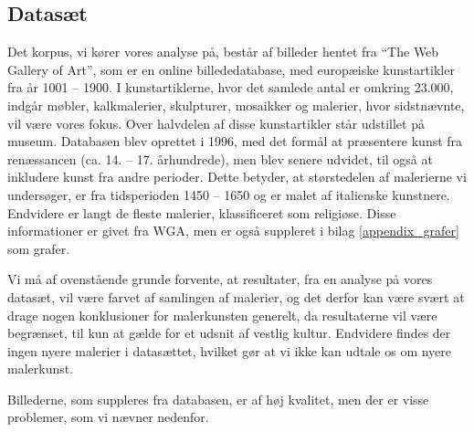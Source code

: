 {\subsection{Datasæt}
Det korpus, vi kører vores analyse på, består af billeder hentet fra
``The Web Gallery of Art''\cite{wgahu}, som er en online billededatabase, med
europæiske kunstartikler fra år 1001 -- 1900. I kunstartiklerne, hvor
det samlede antal er omkring 23.000, indgår møbler, kalkmalerier,
skulpturer, mosaikker og malerier, hvor sidstnævnte, vil være vores
fokus. Over halvdelen af disse kunstartikler står udstillet på museum.
Databasen blev oprettet i 1996, med det formål at præsentere kunst fra
renæssancen (ca.  14. -- 17.  århundrede), men blev senere udvidet, til
også at inkludere kunst fra andre perioder. Dette betyder, at
størstedelen af malerierne vi undersøger, er fra tidsperioden 1450 --
1650 og er malet af italienske kunstnere. Endvidere er langt de fleste
malerier, klassificeret som religiøse.  Disse informationer er givet fra
WGA, men er også suppleret i bilag \ref{appendix_grafer} som
grafer.

Vi må af ovenstående grunde forvente, at resultater, fra en analyse på
vores datasæt, vil være farvet af samlingen af malerier, og det derfor
kan være svært at drage nogen konklusioner for malerkunsten generelt, da
resultaterne vil være begrænset, til kun at gælde for et udsnit af
vestlig kultur. Endvidere findes der ingen nyere malerier i datasættet,
hvilket gør at vi ikke kan udtale os om nyere malerkunst.

Billederne, som suppleres fra databasen, er af høj kvalitet, men der er
visse problemer, som vi nævner nedenfor.

}

